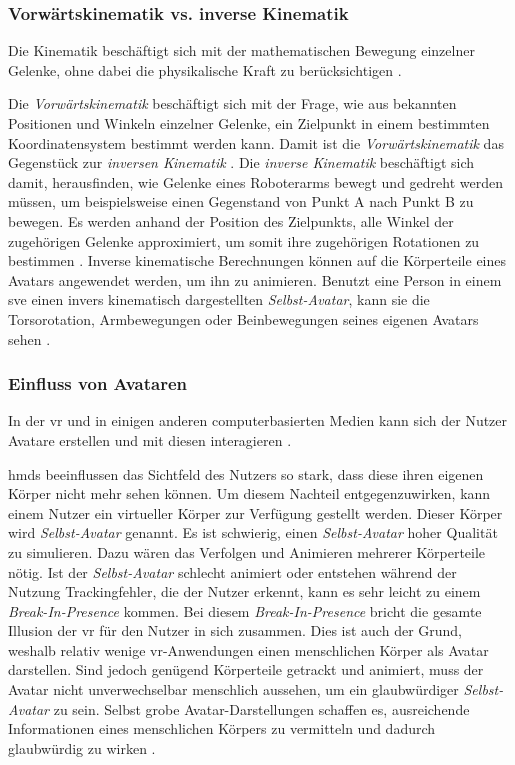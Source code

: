 \documentclass[a4paper,11pt]{article}%
\renewcommand{\\}{\vspace*{0.5\baselineskip} \newline}
\begin{document}
\subsubsection{Vorwärtskinematik vs. inverse Kinematik}
Die Kinematik beschäftigt sich mit der mathematischen Bewegung einzelner Gelenke, ohne dabei die physikalische Kraft zu berücksichtigen \citep[S. 1]{beggs1983kinematics}.

Die \textit{Vorwärtskinematik} beschäftigt sich mit der Frage, wie aus bekannten Positionen und Winkeln einzelner Gelenke, ein Zielpunkt in einem bestimmten Koordinatensystem bestimmt werden kann. Damit ist die \textit{Vorwärtskinematik} das Gegenstück zur \textit{inversen Kinematik} \citep[S. 119]{kucuk2006robot}.
\label{inverseKinematik}
Die \textit{inverse Kinematik} beschäftigt sich damit, herausfinden, wie Gelenke eines Roboterarms bewegt und gedreht werden müssen, um beispielsweise einen Gegenstand von Punkt A nach Punkt B zu bewegen. Es werden anhand der Position des Zielpunkts, alle Winkel der zugehörigen Gelenke approximiert, um somit ihre zugehörigen Rotationen zu bestimmen \citep[S. 299-300]{d2001learning}. Inverse kinematische Berechnungen können auf die Körperteile eines Avatars angewendet werden, um ihn zu animieren. Benutzt eine Person in einem \ac{sve} einen invers kinematisch dargestellten \textit{Selbst-Avatar}, kann sie die Torsorotation, Armbewegungen oder Beinbewegungen seines eigenen Avatars sehen \citep[S. 1]{kim2018real}.

\subsubsection{Einfluss von Avataren}
In der \ac{vr} und in einigen anderen computerbasierten Medien kann sich der Nutzer Avatare erstellen und mit diesen interagieren \citep[S. 1]{neustaedter2009presenting}.

\ac{hmd}s beeinflussen das Sichtfeld des Nutzers so stark, dass diese ihren eigenen Körper nicht mehr sehen können. Um diesem Nachteil entgegenzuwirken, kann einem Nutzer ein virtueller Körper zur Verfügung gestellt werden. Dieser Körper wird \textit{Selbst-Avatar} genannt.
Es ist schwierig, einen \textit{Selbst-Avatar} hoher Qualität zu simulieren. Dazu wären das Verfolgen und Animieren mehrerer Körperteile nötig. Ist der \textit{Selbst-Avatar} schlecht animiert oder entstehen während der Nutzung Trackingfehler, die der Nutzer erkennt, kann es sehr leicht zu einem \textit{Break-In-Presence} kommen. Bei diesem \textit{Break-In-Presence} bricht die gesamte Illusion der \ac{vr} für den Nutzer in sich zusammen. 
Dies ist auch der Grund, weshalb relativ wenige \ac{vr}-Anwendungen einen menschlichen Körper als Avatar darstellen.
Sind jedoch genügend Körperteile getrackt und animiert, muss der Avatar nicht unverwechselbar menschlich aussehen, um ein glaubwürdiger \textit{Selbst-Avatar} zu sein. Selbst grobe Avatar-Darstellungen schaffen es, ausreichende Informationen eines menschlichen Körpers zu vermitteln und dadurch glaubwürdig zu wirken \citep{lok2003effects}.
\end{document}
